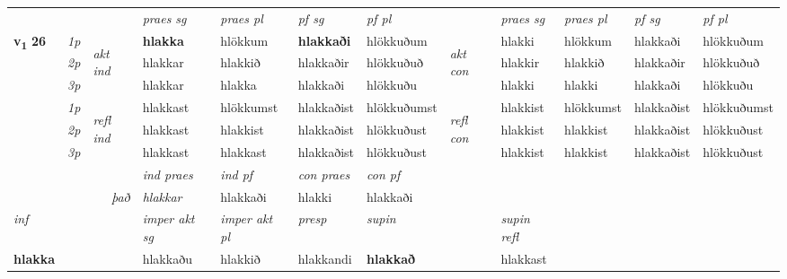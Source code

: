 \begin{longtable}[l]{X>{\footnotesize\itshape}llXXXXlXXXX}
\midrule

 & &   & \textit{praes sg}  & \textit{praes pl}    & \textit{ pf sg} & \textit{pf pl} & & \textit{praes sg}  & \textit{praes pl}    & \textit{pf sg} & \textit{pf pl }  \\ \cmidrule{4-7} \cmidrule{9-12}
 \multirow{2}{*}{{{\textbf{v{\textsubscript{1}}} \Large{\textbf{26}}}}}  & 1p & \multirow{3}{*}{\begin{turn}{90}\textit{akt ind}\end{turn}} & \textbf{hlakka} & hlökkum & \textbf{hlakkaði} & hlökkuðum & \multirow{3}{*}{\begin{turn}{90}\textit{akt con}\end{turn}} &hlakki & hlökkum & hlakkaði & hlökkuðum\\*
 & 2p &  &  hlakkar  & hlakkið & hlakkaðir & hlökkuðuð & & hlakkir & hlakkið & hlakkaðir & hlökkuðuð \\*
 & 3p &  & hlakkar & hlakka & hlakkaði & hlökkuðu & & hlakki & hlakki& hlakkaði & hlökkuðu \\*
\cmidrule{4-7} \cmidrule{9-12}
 & 1p & \multirow{3}{*}{\begin{turn}{90}\textit{refl ind}\end{turn}}  & hlakkast & hlökkumst & hlakkaðist & hlökkuðumst & \multirow{3}{*}{\begin{turn}{90}\textit{refl con}\end{turn}}  &hlakkist & hlökkumst & hlakkaðist & hlökkuðumst \\*
 & 2p &  & hlakkast & hlakkist & hlakkaðist & hlökkuðust & &hlakkist & hlakkist & hlakkaðist & hlökkuðust \\*
 & 3p  & & hlakkast & hlakkast & hlakkaðist & hlökkuðust & & hlakkist & hlakkist& hlakkaðist & hlökkuðust \\*
\cmidrule{4-7} \cmidrule{9-12}

   && &  \textit{ind praes} & \textit{ind pf} & \textit{con praes} & \textit{con pf} \\*
\multicolumn{3}{r}{\textit{það}} & hlakkar & hlakkaði & hlakki & hlakkaði \\*

\cmidrule{4-7}
   {\textit{inf}} & &  & \textit{imper akt sg} & \textit{imper akt pl}   & \textit{presp} & \textit{supin} && \textit{supin refl}  \\*
  {\textbf{hlakka}} & && hlakkaðu  & hlakkið   & hlakkandi &  \textbf{hlakkað} && hlakkast  \\*

\midrule


\end{longtable}
